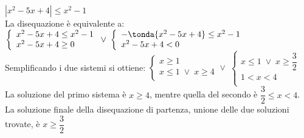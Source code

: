 \begin{esempio} \(|x^2-5x+4|\leq x^2-1\)\\[4pt] La disequazione è equivalente a:
\(\left\lbrace 
\begin{array}{l}
x^2-5x+4\leq x^2-1\\
x^2-5x+4\geq 0\\
\end{array}
\right.
\vee \;
\left\lbrace 
\begin{array}{l}
-\tonda{x^2-5x+4}\leq x^2-1\\
x^2-5x+4< 0\\
\end{array}
\right.\) \\[4pt]
Semplificando i due sistemi si ottiene:
\(\left\lbrace 
\begin{array}{l}
x\geq 1\\
x \leq 1 \; \vee \; x \geq 4\\
\end{array}
\right.
\vee \;
\left\lbrace 
\begin{array}{l}
x\leq 1 \; \vee \;x \geq \dfrac{3}{2}\\[6pt]
1< x < 4\\
\end{array}
\right.\) \\[4pt]
La soluzione del primo sistema è \(x \geq 4\), mentre quella del secondo è \(\dfrac{3}{2}\leq x <4\).
La soluzione finale della disequazione di partenza, unione delle due soluzioni trovate, è \(x \geq \dfrac{3}{2}\)
\end{esempio}









